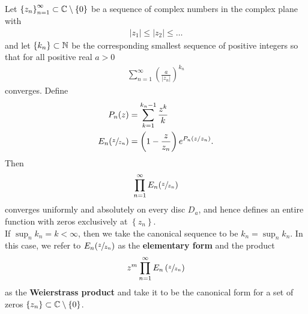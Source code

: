 \documentclass{memoir}
\begin{document}
\begin{thm}
	Let \(\left\{ z_n \right\}_{n=1}^{\infty} \subset \mathbb{C}\setminus\left\{ 0 \right\} \) be a sequence of complex numbers in the complex plane with
	\begin{align*}
		\left| z_1 \right| \leq \left| z_2 \right| \leq \ldots
	\end{align*}
	and let \(\left\{ k_n \right\} \subset \mathbb{N}\) be the corresponding smallest sequence of positive integers so that for all positive real \(a>0\)
	\begin{align*}
		\sum_{n=1}^{\infty} \left( \frac{a}{\left| z_n \right| } \right)^{k_n} 
	\end{align*}
	converges. Define
	\begin{align*}
		P_n(z) &= \sum_{k=1}^{k_n-1} \frac{z^{k}}{k}\\
		E_n( \sfrac{z}{z_n}) &= \left( 1- \frac{z}{z_n} \right) e^{P_n(z / z_n)} .
	\end{align*}
	Then
	\begin{align*}
		\prod_{n=1}^{\infty} E_n( \sfrac{z }{z_n})   
	\end{align*}
	converges uniformly and absolutely on every disc \(D_a\), and hence defines an entire function with zeros exclusively at \(\left\{ z_n \right\} \).\\

	If \(\sup_{n} k_n = k< \infty\), then we take the canonical sequence to be \(k_n = \sup_{n} k_n\). In this case, we refer to \(E_n(\sfrac{z}{z_n})\) as the \textbf{elementary form} and the product
	 \begin{align*}
		 z^{m} \prod_{n=1}^{\infty} E_n \left( \sfrac{z}{z_n} \right)
	\end{align*}
	as the \textbf{Weierstrass product} and take it to be the canonical form for a set of zeros \(\left\{ z_n \right\} \subset \mathbb{C}\setminus\left\{ 0 \right\} \).
\end{thm}
\end{document}
